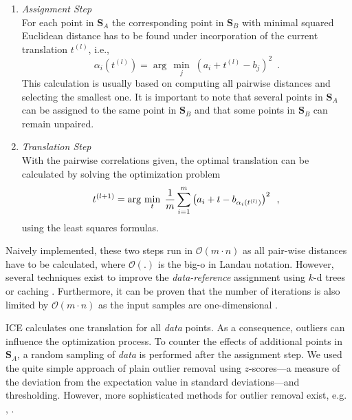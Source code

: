 \documentclass[conference]{IEEEtran}
\theoremstyle{examplestyle}
\begin{document}
\begin{enumerate}
 \item \emph{Assignment Step}\\
For each point in \(\pmb{S}_A\) the corresponding point in \(\pmb{S}_B\) with minimal squared Euclidean distance has to be found under incorporation of the current translation $t^{(l)}$, i.e., 
\begin{equation}
\alpha_i(t^{(l)})= \arg\,\min\limits_j \; (a_i+t^{(l)}-b_j)^2 \enspace .
\end{equation}
This calculation is usually based on computing all pairwise distances and selecting the smallest one. It is important to note that several points in \(\pmb{S}_A\) can be assigned to the same point in \(\pmb{S}_B\) and that some points in \(\pmb{S}_B\) can remain unpaired.



\item \emph{Translation Step}\\
With the pairwise correlations given, the optimal translation can be calculated by solving the optimization problem
\begin{equation}
t^{(l+1)}= \arg\,\min\limits_{t} \; \dfrac{1}{m} \sum_{i = 1}^{m} \left( a_i + t - b_{\alpha_i(t^{(l)})} \right)^2 \enspace , \\
\end{equation}
using the least squares formulas.
 
\end{enumerate}




Naively implemented, these two steps run in \(\mathcal{O}(m \cdot n)\) as all pair-wise distances have to be calculated, where $\mathcal{O}(.)$ is the big-o in Landau notation. However, several techniques exist to improve the \textit{data-reference} assignment using \(k\)-d trees or caching \cite{Pomerleau2015}. Furthermore, it can be proven that the number of iterations is also limited by \(\mathcal{O}(m \cdot n)\) as the input samples are one-dimensional \cite{Ezra2008}.

\ac{ICE} calculates one translation for all \textit{data} points. As a consequence, outliers can influence the optimization process. To counter the effects of additional points in \(\pmb{S}_A\), a random sampling of \textit{data} is performed after the assignment step. We used the quite simple approach of plain outlier removal using \(z\)-scores---a measure of the deviation from the expectation value in standard deviations---and thresholding.
However, more sophisticated methods for outlier removal exist, e.g. \cite{Hontani2012}, \cite{Phillips2007}.
\end{document}
